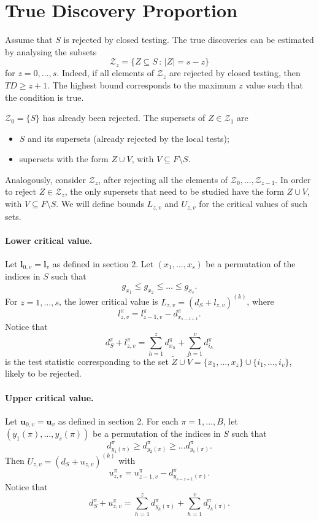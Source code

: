 \documentclass[11pt,a4paper,openright,twoside]{article}
\begin{document}
\newpage
\section{True Discovery Proportion}

Assume that $S$ is rejected by closed testing. The true discoveries can be estimated by analysing the subsets
\[\mathcal{Z}_z=\{Z\subseteq S\,:\, |Z|=s-z\}\]
for $z=0,\ldots,s$. Indeed, if all elements of $\mathcal{Z}_z$ are rejected by closed testing, then $TD \geq z+1$. The highest bound corresponds to the maximum $z$ value such that the condition is true.

$\mathcal{Z}_0=\{S\}$ has already been rejected. The supersets of $Z\in\mathcal{Z}_1$ are
\begin{itemize}
\item $S$ and its supersets (already rejected by the local tests);
\item supersets with the form $Z\cup V$, with $V\subseteq F\setminus S$.
\end{itemize}

Analogously, consider $\mathcal{Z}_z$, after rejecting all the elements of $\mathcal{Z}_0,\ldots,\mathcal{Z}_{z-1}$. In order to reject $Z\in\mathcal{Z}_z$, the only supersets that need to be studied have the form $Z\cup V$, with $V\subseteq F\setminus S$. We will define bounds $L_{z,v}$ and $U_{z,v}$ for the critical values of such sets.



\paragraph{Lower critical value.}  Let $\mathbf{l}_{0,v}=\mathbf{l}_v$ as defined in section 2. Let $(x_1,\ldots,x_s)$ be a permutation of the indices in $S$ such that
\[ g_{x_1}\leq g_{x_2}\leq\ldots\leq g_{x_s}.\]
For $z=1,\ldots,s$, the lower critical value is $L_{z,v}=(d_S + l_{z,v})^{(k)}$, where
\[l_{z,v}^\pi = l_{z-1,v}^\pi - d_{x_{s-z+1}}^\pi .\]
Notice that
\[d_S^\pi + l_{z,v}^\pi = \sum_{h=1}^z d_{x_h}^\pi + \sum_{h=1}^v d_{i_h}^\pi \]
is the test statistic corresponding to the set $\tilde{Z}\cup\tilde{V}=\{x_1,\ldots,x_z\}\cup\{i_1,\ldots,i_v\}$, likely to be rejected.


\paragraph{Upper critical value.} Let $\mathbf{u}_{0,v}=\mathbf{u}_v$ as defined in section 2. For each $\pi=1,\ldots,B$, let $(y_1(\pi),\ldots,y_s(\pi))$ be a permutation of the indices in $S$ such that
\[ d_{y_1(\pi)}^\pi\geq d_{y_2(\pi)}^\pi\geq\ldots d_{y_s(\pi)}^\pi .\]
Then $U_{z,v}=(d_{S} + u_{z,v})^{(k)}$ with
\[u_{z,v}^\pi = u_{z-1,v}^\pi - d_{y_{s-z+1}(\pi)}^\pi .\]
Notice that
\[d_{S}^\pi + u_{z,v}^\pi = \sum_{h=1}^z d_{y_h(\pi)}^\pi + \sum_{h=1}^v d_{j_h(\pi)}^\pi .\]
\end{document}
